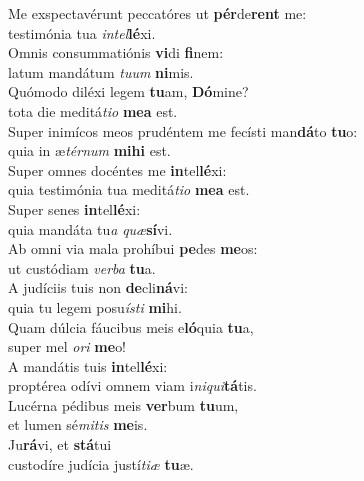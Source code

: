 \oddverse Me exspectavérunt peccatóres ut \textbf{pér}de\textbf{rent} me:~\*\\
\oddverse testimónia tua \textit{in}\textit{tel}\textbf{lé}xi.\\
\evenverse Omnis consummatiónis \textbf{vi}di \textbf{fi}nem:~\*\\
\evenverse latum mandátum \textit{tu}\textit{um} \textbf{ni}mis.\\
\oddverse Quómodo diléxi legem \textbf{tu}am, \textbf{Dó}mine?~\*\\
\oddverse tota die meditá\textit{ti}\textit{o} \textbf{me}\textbf{a} est.\\
\evenverse Super inimícos meos prudéntem me fecísti man\textbf{dá}to \textbf{tu}o:~\*\\
\evenverse quia in æ\textit{tér}\textit{num} \textbf{mi}\textbf{hi} est.\\
\oddverse Super omnes docéntes me \textbf{in}tel\textbf{lé}xi:~\*\\
\oddverse quia testimónia tua meditá\textit{ti}\textit{o} \textbf{me}\textbf{a} est.\\
\evenverse Super senes \textbf{in}tel\textbf{lé}xi:~\*\\
\evenverse quia mandáta tu\textit{a} \textit{quæ}\textbf{sí}vi.\\
\oddverse Ab omni via mala prohíbui \textbf{pe}des \textbf{me}os:~\*\\
\oddverse ut custódiam \textit{ver}\textit{ba} \textbf{tu}a.\\
\evenverse A judíciis tuis non \textbf{de}cli\textbf{ná}vi:~\*\\
\evenverse quia tu legem posu\textit{í}\textit{sti} \textbf{mi}hi.\\
\oddverse Quam dúlcia fáucibus meis e\textbf{ló}quia \textbf{tu}a,~\*\\
\oddverse super mel \textit{o}\textit{ri} \textbf{me}o!\\
\evenverse A mandátis tuis \textbf{in}tel\textbf{lé}xi:~\*\\
\evenverse proptérea odívi omnem viam i\textit{ni}\textit{qui}\textbf{tá}tis.\\
\oddverse Lucérna pédibus meis \textbf{ver}bum \textbf{tu}um,~\*\\
\oddverse et lumen sé\textit{mi}\textit{tis} \textbf{me}is.\\
\evenverse Ju\textbf{rá}vi, et \textbf{stá}tui~\*\\
\evenverse custodíre judícia justí\textit{ti}\textit{æ} \textbf{tu}æ.\\
